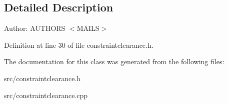 \subsection{Detailed Description}
\begin{Desc}
\item[Author:]AUTHORS $<$MAILS$>$ \end{Desc}


Definition at line 30 of file constraintclearance.h.

The documentation for this class was generated from the following files:\begin{CompactItemize}
\item 
src/constraintclearance.h\item 
src/constraintclearance.cpp\end{CompactItemize}
